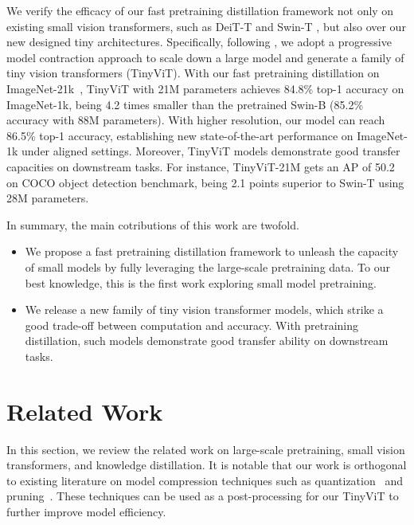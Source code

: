 \documentclass[runningheads]{llncs}
\begin{document}
We verify the efficacy of our fast pretraining distillation framework not only on existing small vision transformers, such as DeiT-T \cite{deit} and Swin-T \cite{swin}, but also over our new designed tiny architectures. Specifically, following \cite{x3d}, we adopt a progressive model contraction approach to scale down a large model and generate a family of tiny vision transformers (TinyViT). With our fast pretraining distillation on ImageNet-21k~\cite{imagenet}, TinyViT with 21M parameters achieves 84.8\% top-1 accuracy on ImageNet-1k, being 4.2 times smaller than the pretrained Swin-B (85.2\% accuracy with 88M parameters). With higher resolution, our model can reach 86.5\% top-1 accuracy, establishing new state-of-the-art performance on ImageNet-1k under aligned settings. Moreover, TinyViT models demonstrate good transfer capacities on downstream tasks. For instance, TinyViT-21M gets an AP of 50.2 on COCO object detection benchmark, being 2.1 points superior to Swin-T using 28M parameters.

In summary, the main cotributions of this work are twofold.
\vspace{-1mm}
\begin{itemize}
    \item We propose a fast pretraining distillation framework to unleash the capacity of small models by fully leveraging the large-scale pretraining data. To our best knowledge, this is the first work exploring small model pretraining. 
    
    \item We release a new family of tiny vision transformer models, which strike a good trade-off between computation and accuracy. With pretraining distillation, such models demonstrate good transfer ability on downstream tasks.
\end{itemize}

\vspace{-5mm}
\section{Related Work}
\vspace{-2mm}

In this section, we review the related work on large-scale pretraining, small vision transformers, and knowledge distillation. 
It is notable that our work is orthogonal to existing literature on model compression techniques such as quantization~\cite{ptq,jacob2018quantization,han2015deep,ptq} and pruning~\cite{VTP,NViT,uvc,spvit}.
These techniques can be used as a post-processing for our TinyViT to further improve model efficiency.
\end{document}
